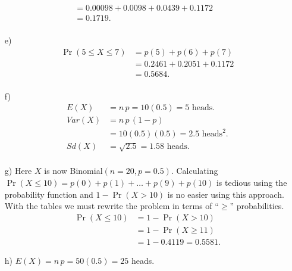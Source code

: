\documentclass[12pt]{article}
\begin{document}
{\begin{minipage}[t]{0.98\textwidth}
\begin{minipage}[t]{0.47\textwidth}
\begin{enumerate}[a)]
\begin{align*}
&= 0.00098 + 0.0098 + 0.0439 + 0.1172 \\[0.2cm]
&= 0.1719. \\[0.2cm]
\end{align*}
\end{enumerate}
\end{minipage}\hspace{0.04\textwidth}
\begin{minipage}[t]{0.47\textwidth}
\begin{enumerate}
\item[e)] \quad\\[-1.45cm]
\begin{align*}
\Pr(5 \le X \le 7) &= p(5) + p(6) + p(7) \\[0.2cm]
&=  0.2461 + 0.2051 + 0.1172 \\[0.2cm]
&= 0.5684. \\[-0.2cm]
\end{align*}
\item[f)] \quad\\[-1.45cm]
\begin{align*}
E(X) &= n\,p = 10(0.5) = 5 \text{ heads}.\\[0.3cm]
Var(X) &= n\,p\,(1-p) \\&= 10(0.5)(0.5) = 2.5 \text{ heads$^2$}.\\[0.3cm]
Sd(X) &= \sqrt{2.5} = 1.58 \text{ heads}.\\[-0.3cm]
\end{align*}
\item[g)] Here $X$ is now Binomial$(n=20,p=0.5)$. Calculating $\Pr(X \le 10) = p(0) + p(1) + \ldots + p(9) + p(10)$ is tedious using the probability function and $1 - \Pr(X > 10)$ is no easier using this approach.\\[0.2cm]
    With the tables we must rewrite the problem in terms of ``$\ge$'' probabilities.
\begin{align*}
\Pr(X \le 10) &= 1 - \Pr(X > 10) \\
&= 1 - \Pr(X \ge 11) \\
&= 1 - 0.4119 = 0.5581.
\end{align*}
\item[h)] $E(X) = n\,p = 50(0.5) = 25$ heads.
\end{enumerate}
\end{minipage}
\end{minipage}}\vspace{0.03\textwidth}
\end{document}
